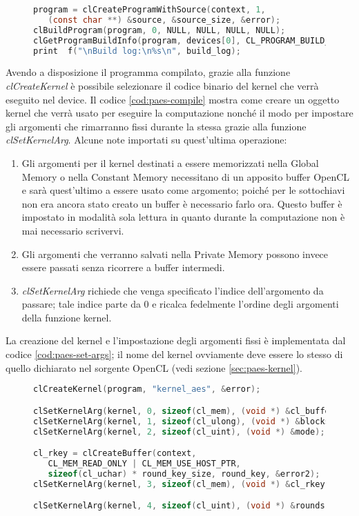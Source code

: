 \documentclass[12pt,a4paper,oneside]{book}
\begin{document}
\begin{figure}
\begin{lstlisting}[caption={\textit{Compilazione del programma da eseguire sul dispositivo.}},label={cod:paes-compile},language=C]
program = clCreateProgramWithSource(context, 1,
   (const char **) &source, &source_size, &error);
clBuildProgram(program, 0, NULL, NULL, NULL, NULL);
clGetProgramBuildInfo(program, devices[0], CL_PROGRAM_BUILD_LOG, 300, build_log, NULL);
print  f("\nBuild log:\n%s\n", build_log);
\end{lstlisting}
\end{figure}

Avendo a disposizione il programma compilato, grazie alla funzione \textit{clCreateKernel} è possibile selezionare il codice binario del kernel che verrà eseguito nel device. Il codice \ref{cod:paes-compile} mostra come creare un oggetto kernel che verrà usato per eseguire la computazione nonché il modo per impostare gli argomenti che rimarranno fissi durante la stessa grazie alla funzione \textit{clSetKernelArg}. Alcune note importati su quest'ultima operazione:
\begin{enumerate}
\item Gli argomenti per il kernel destinati a essere memorizzati nella Global Memory o nella Constant Memory necessitano di un apposito buffer \ac{OpenCL} e sarà quest'ultimo a essere usato come argomento; poiché per le sottochiavi non era ancora stato creato un buffer è necessario farlo ora. Questo buffer è impostato in modalità sola lettura in quanto durante la computazione non è mai necessario scrivervi.
\item Gli argomenti che verranno salvati nella Private Memory possono invece essere passati senza ricorrere a buffer intermedi.
\item \textit{clSetKernelArg} richiede che venga specificato l'indice dell'argomento da passare; tale indice parte da 0 e ricalca fedelmente l'ordine degli argomenti della funzione kernel.
\end{enumerate}
La creazione del kernel e l'impostazione degli argomenti fissi è implementata dal codice \ref{cod:paes-set-args}; il nome del kernel ovviamente deve essere lo stesso di quello dichiarato nel sorgente \ac{OpenCL} (vedi sezione \ref{sec:paes-kernel}).

\begin{figure}
\begin{lstlisting}[caption={\textit{Creazione del kernel e impostazione degli argomenti fissi.}},label={cod:paes-set-args},language=C]
clCreateKernel(program, "kernel_aes", &error);

clSetKernelArg(kernel, 0, sizeof(cl_mem), (void *) &cl_buffer);
clSetKernelArg(kernel, 1, sizeof(cl_ulong), (void *) &blocks);
clSetKernelArg(kernel, 2, sizeof(cl_uint), (void *) &mode);

cl_rkey = clCreateBuffer(context,
   CL_MEM_READ_ONLY | CL_MEM_USE_HOST_PTR,
   sizeof(cl_uchar) * round_key_size, round_key, &error2);
clSetKernelArg(kernel, 3, sizeof(cl_mem), (void *) &cl_rkey);

clSetKernelArg(kernel, 4, sizeof(cl_uint), (void *) &rounds);
\end{lstlisting}
\end{figure}
\end{document}

